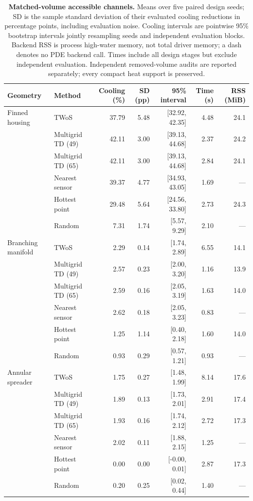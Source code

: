 \begin{table}[t]
\centering\small
\caption{\textbf{Matched-volume accessible channels.} Means over five paired design seeds; SD is the sample standard deviation of their evaluated cooling reductions in percentage points, including evaluation noise. Cooling intervals are pointwise 95\% bootstrap intervals jointly resampling seeds and independent evaluation blocks. Backend RSS is process high-water memory, not total driver memory; a dash denotes no PDE backend call. Times include all design stages but exclude independent evaluation. Independent removed-volume audits are reported separately; every compact heat support is preserved.}
\label{tab:submissionchannels}
\begin{tabular}{llrrrrr}
\toprule
Geometry & Method & Cooling (\%) & SD (pp) & 95\% interval & Time (s) & RSS (MiB) \\
\midrule
Finned housing & TWoS & 37.79 & 5.48 & [32.92, 42.35] & 4.48 & 24.1 \\
 & Multigrid TD (49) & 42.11 & 3.00 & [39.13, 44.68] & 2.37 & 24.2 \\
 & Multigrid TD (65) & 42.11 & 3.00 & [39.13, 44.68] & 2.84 & 24.1 \\
 & Nearest sensor & 39.37 & 4.77 & [34.93, 43.05] & 1.69 & --- \\
 & Hottest point & 29.48 & 5.64 & [24.56, 33.80] & 2.73 & 24.3 \\
 & Random & 7.31 & 1.74 & [5.57, 9.29] & 2.10 & --- \\
\midrule
Branching manifold & TWoS & 2.29 & 0.14 & [1.74, 2.89] & 6.55 & 14.1 \\
 & Multigrid TD (49) & 2.57 & 0.23 & [2.00, 3.20] & 1.16 & 13.9 \\
 & Multigrid TD (65) & 2.59 & 0.16 & [2.05, 3.19] & 1.63 & 14.0 \\
 & Nearest sensor & 2.62 & 0.18 & [2.05, 3.23] & 0.83 & --- \\
 & Hottest point & 1.25 & 1.14 & [0.40, 2.18] & 1.60 & 14.0 \\
 & Random & 0.93 & 0.29 & [0.57, 1.21] & 0.93 & --- \\
\midrule
Annular spreader & TWoS & 1.75 & 0.27 & [1.48, 1.99] & 8.14 & 17.6 \\
 & Multigrid TD (49) & 1.89 & 0.13 & [1.73, 2.01] & 2.91 & 17.4 \\
 & Multigrid TD (65) & 1.93 & 0.16 & [1.74, 2.12] & 2.72 & 17.3 \\
 & Nearest sensor & 2.02 & 0.11 & [1.88, 2.15] & 1.25 & --- \\
 & Hottest point & 0.00 & 0.00 & [-0.00, 0.01] & 2.87 & 17.3 \\
 & Random & 0.20 & 0.25 & [0.02, 0.44] & 1.40 & --- \\
\bottomrule
\end{tabular}
\end{table}

